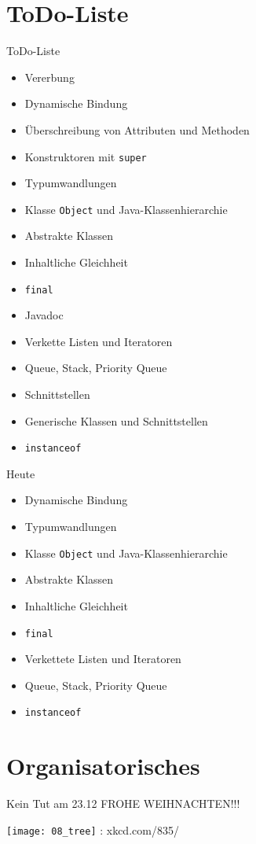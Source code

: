 \documentclass[18pt]{beamer}
\begin{document}
\section{ToDo-Liste}
\begin{frame}[fragile]{ToDo-Liste}
\begin{itemize}
 \item Vererbung \checkmark
 \item Dynamische Bindung
 \item Überschreibung von Attributen und Methoden \checkmark
 \item Konstruktoren mit \verb|super| \checkmark
 \item Typumwandlungen 
 \item Klasse \verb|Object| und Java-Klassenhierarchie
 \item Abstrakte Klassen
 \item Inhaltliche Gleichheit
 \item \verb|final|
 \item Javadoc \checkmark
 \item Verkette Listen und Iteratoren
 \item Queue, Stack, Priority Queue
 \item Schnittstellen \checkmark
 \item Generische Klassen und Schnittstellen \checkmark
  \item \verb|instanceof|
\end{itemize}
\end{frame}

\begin{frame}[fragile]{Heute}
\begin{itemize}
 \item Dynamische Bindung
 \item Typumwandlungen
 \item Klasse \verb|Object| und Java-Klassenhierarchie
 \item Abstrakte Klassen
 \item Inhaltliche Gleichheit
 \item \verb|final|
 \item Verkettete Listen und Iteratoren
 \item Queue, Stack, Priority Queue
 \item \verb|instanceof|
\end{itemize}
\end{frame}

\section{Organisatorisches}
\begin{frame}{Kein Tut am 23.12}
 \large FROHE WEIHNACHTEN!!!
 
 \texttt{[image: 08\_tree]}
 \tiny: xkcd.com/835/
\end{frame}
\end{document}
